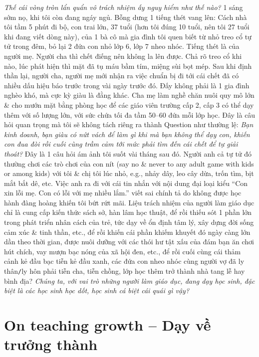 \documentclass[12pt,oneside]{book}
\begin{document}
{\it Thế cái vòng tròn lẩn quẩn vô trách nhiệm ấy nguy hiểm như thế nào?} 1 sáng sớm nọ, khi tôi còn đang ngáy ngủ. Bỗng dưng 1 tiếng thét vang lên: Cách nhà tôi tầm 5 phút đi bộ, con trai lớn, 37 tuổi (hơn tôi đúng 10 tuổi, nên tôi 27 tuổi khi đang viết dòng này), của 1 bà cô mà gia đình tôi quen biết từ nhỏ treo cổ tự tử trong đêm, bỏ lại 2 đứa con nhỏ lớp 6, lớp 7 nheo nhóc. Tiếng thét là của người mẹ. Người cha thì chết điếng nên không la lên được. Chả rõ treo cổ khi nào, lúc phát hiện thì mặt đã tụ máu bầm tím, miệng sùi bọt mép. Sau khi định thần lại, người cha, người mẹ mới nhận ra việc chuẩn bị đi tới cái chết đã có nhiều dấu hiệu báo trước trong vài ngày trước đó. Đấy không phải là 1 gia đình nghèo khó, mà cực kỳ giàu là đằng khác. Cha mẹ làm nghề chăn nuôi quy mô lớn \& cho mướn mặt bằng phòng học để các giáo viên trường cấp 2, cấp 3 có thể dạy thêm với số lượng lớn, với sức chứa tối đa tầm 50--60 đứa mỗi lớp học. Đây là câu hỏi quan trọng mà tôi sẽ không tách riêng ra thành Question như thường lệ: {\it Bạn kinh doanh, bạn giàu có nứt vách để làm gì khi mà bạn không thể dạy con, khiến con đua đòi rồi cuối cùng trầm cảm tới mức phải tìm đến cái chết để tự giải thoát?} Đây là 1 câu hỏi ám ảnh tôi suốt vài tháng sau đó. Người anh cả tự tử đó thường chơi các trò chơi của con nít (say no \& never to any adult game with kids or among kids) với tôi \& chị tôi lúc nhỏ, e.g., nhảy dây, leo cây dừa, trốn tìm, bịt mắt bắt dê, etc. Việc anh ra đi với cái tin nhắn với nội dung đại loại kiểu ``Con xin lỗi mẹ. Con có lỗi với mẹ nhiều lắm.'' viết sai chính tả do không được học hành đàng hoàng khiến tôi bứt rứt mãi. Liệu trách nhiệm của người làm giáo dục chỉ là cung cấp kiến thức sách sở, hàn lâm học thuật, để rồi thiếu sót 1 phần lớn trong phát triển nhân cách của trẻ, tức dạy về ổn định tâm lý, xây dựng đời sống cảm xúc \& tinh thần, etc., để rồi khiến cái phần khiếm khuyết đó ngày càng lớn dần theo thời gian, được nuôi dưỡng với các thói hư tật xấu của đám bạn ăn chơi hút chích, vay mượn bạc nóng của xã hội đen, etc., để rồi cuối cùng cái thảm cảnh kẻ đầu bạc tiễn kẻ đầu xanh, các đứa con nheo nhóc cùng người vợ đã ly thân{\tt/}ly hôn phải tiễn cha, tiễn chồng, lớp học thêm trở thành nhà tang lễ hay bình địa? {\it Chúng ta, với vai trò những người làm giáo dục, đang dạy học sinh, đặc biệt là các học sinh học dốt, học sinh cá biệt cái quái gì vậy?}

\section{On teaching growth -- Dạy về trưởng thành}
\end{document}
